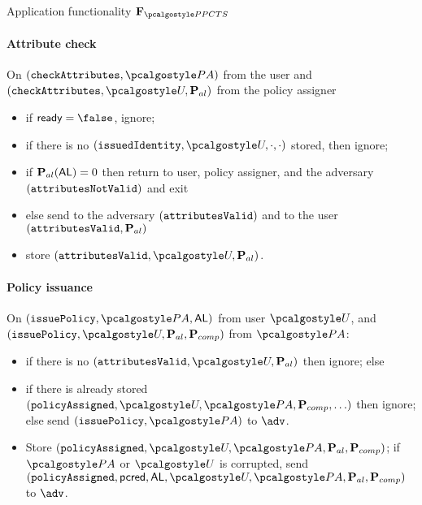 \documentclass[runningheads,10pt]{llncs}
\numberwithin{equation}{section}
\begin{document}
\begin{funcbox}{Application functionality $\func{\PPCTS}$}
  \paragraph{Attribute check}
  On $(\checkAttributes, \polas)$ from the user and $(\checkAttributes, \user, \alpolicy)$
  from the policy assigner
  \begin{itemize}
  \item if $\ready = \false$, ignore;
  \item if there is no $(\issuedIdentity, \user, \cdot, \cdot)$ stored, then ignore;
  \item if $\mathbf{P}_{al} (\mathsf{AL}) = 0$ then return to user, policy assigner, and the
    adversary $(\mathtt{attributesNotValid})$ and exit
  \item else send to the adversary $(\mathtt{attributesValid})$ and to the user
    $(\mathtt{attributesValid}, \mathbf{P}_{al})$
  \item store $(\attributesValid, \user, \alpolicy)$.
  \end{itemize}
  
  \paragraph{Policy issuance}
  On $(\issuePolicy, \polas, \AL)$ from user $\user$, and $(\issuePolicy,
  \user, \alpolicy, \comppolicy)$ from $\polas$:
  \begin{itemize}
  \item if there is no $(\attributesValid, \user, \alpolicy)$ then ignore; else 
  \item if there is already stored
    $(\policyAssigned, \user, \polas, \comppolicy, \ldots)$ then ignore; else
    send $(\issuePolicy, \polas)$  to $\adv$.
  \item Store $(\policyAssigned, \user, \polas, \alpolicy, \comppolicy)$;
    if $\polas$ or $\user$ is corrupted, send
    $(\policyAssigned, \pcred, \AL, \user, \polas, \allowbreak \alpolicy,
    \comppolicy)$ to $\adv$.
  \end{itemize}


\end{funcbox}
\end{document}
